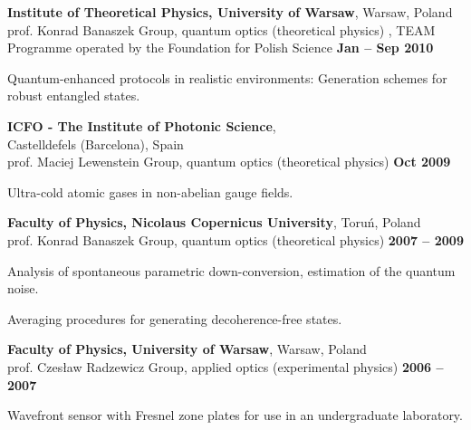 \documentclass[margin,line]{resume}
\begin{document}
\begin{resume}
	{\bf Institute of Theoretical Physics, University of Warsaw}, Warsaw, Poland\\
	prof. Konrad Banaszek Group, quantum optics (theoretical physics) ,
	TEAM Programme operated by the Foundation for Polish Science \hfill {\bf Jan -- Sep 2010}\\
    \begin{list2}
        \vspace*{-4mm}
        \item Quantum-enhanced protocols in realistic environments: Generation schemes for robust entangled states.
    \end{list2}

    {\bf ICFO - The Institute of Photonic Science},\\ Castelldefels (Barcelona), Spain\\
    prof. Maciej Lewenstein Group, quantum optics (theoretical physics) \hfill {\bf Oct 2009}\\
    \begin{list2}
        \vspace*{-4mm}
        \item Ultra-cold atomic gases in non-abelian gauge fields.
    \end{list2}

    {\bf Faculty of Physics, Nicolaus Copernicus University}, Toruń, Poland\\
    prof. Konrad Banaszek Group, quantum optics (theoretical physics) \hfill {\bf 2007 -- 2009}\\
    \begin{list2}
        \vspace*{-4mm}
        \item Analysis of spontaneous parametric down-conversion, estimation of the quantum noise.
        \item Averaging procedures for generating decoherence-free states.
    \end{list2}

\newpage

    {\bf Faculty of Physics, University of Warsaw}, Warsaw, Poland\\
    prof. Czesław Radzewicz Group, applied optics (experimental physics) \hfill {\bf 2006 -- 2007}\\
    \begin{list2}
        \vspace*{-4mm}
        \item Wavefront sensor with Fresnel zone plates for use in an undergraduate laboratory.
    \end{list2}


\end{resume}
\end{document}
